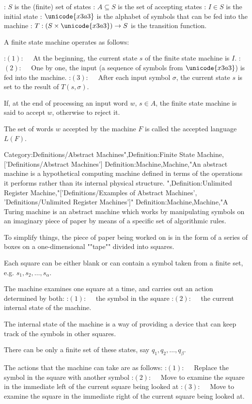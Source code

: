 : $S$ is the (finite) set of states
: $A \subseteq S$ is the set of accepting states
: $I \in S$ is the initial state
: $\unicode{x3a3}$ is the alphabet of symbols that can be fed into the machine
: $T : \left({ S \times \unicode{x3a3} }\right) \rightarrow S$ is the transition function.


A finite state machine operates as follows:

:$(1): \quad$ At the beginning, the current state $s$ of the finite state machine is $I$.
:$(2): \quad$ One by one, the input (a sequence of symbols from $\unicode{x3a3}$) is fed into the machine.
:$(3): \quad$ After each input symbol $\sigma$, the current state $s$ is set to the result of $T\left({s, \sigma}\right)$.


If, at the end of processing an input word $w$, $s \in A$, the finite state machine is said to accept $w$, otherwise to reject it.


The set of words $w$ accepted by the machine $F$ is called the accepted language $L\left({F}\right)$.

Category:Definitions/Abstract Machines",Definition:Finite State Machine,['Definitions/Abstract Machines']
Definition:Machine,Machine,"An abstract machine is a hypothetical computing machine defined in terms of the operations it performs rather than its internal physical structure.
",Definition:Unlimited Register Machine,"['Definitions/Examples of Abstract Machines', 'Definitions/Unlimited Register Machines']"
Definition:Machine,Machine,"A Turing machine is an abstract machine which works by manipulating symbols on an imaginary piece of paper by means of a specific set of algorithmic rules.

To simplify things, the piece of paper being worked on is in the form of a series of boxes on a one-dimensional ""tape"" divided into squares.

Each square can be either blank or can contain a symbol taken from a finite set, e.g. $s_1, s_2, \ldots, s_\alpha$.


The machine examines one square at a time, and carries out an action determined by both:
:$(1): \quad$ the symbol in the square
:$(2): \quad$ the current internal state of the machine.

The internal state of the machine is a way of providing a device that can keep track of the symbols in other squares.

There can be only a finite set of these states, say $q_1, q_2, \ldots, q_\beta$.


The actions that the machine can take are as follows:
:$(1): \quad$ Replace the symbol in the square with another symbol
:$(2): \quad$ Move to examine the square in the immediate left of the current square being looked at
:$(3): \quad$ Move to examine the square in the immediate right of the current square being looked at.

